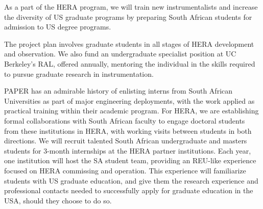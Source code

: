 \documentclass[preprint]{aastex}
\begin{document}
As a part of the HERA program, we will train new instrumentalists and increase
the diversity of US graduate programs by preparing South African students for
admission to US degree programs.

The project plan involves graduate students in all
stages of HERA development and observation. We also fund an
undergraduate specialist position
at UC Berkeley's RAL, offered annually, 
mentoring the individual in the skills required to pursue graduate
research in instrumentation.

PAPER has
an admirable history of enlisting interns from South African
Universities as part of major engineering deployments, with the work
applied as practical training within their academic program.
For HERA, we are establishing formal collaborations with South African
faculty to engage doctoral students from these institutions in HERA,
with working visits between students in both directions. We will
recruit talented South African undergraduate and masters students for
3-month internships at the HERA partner institutions. Each year, one
institution will host the SA student team, providing an REU-like
experience focused on HERA 
commissing and operation. This
experience will familiarize students with US graduate education,
and give them the research experience and professional contacts needed
to successfully apply for graduate education in the USA, 
should they
choose to do so.

%
%
\end{document}
